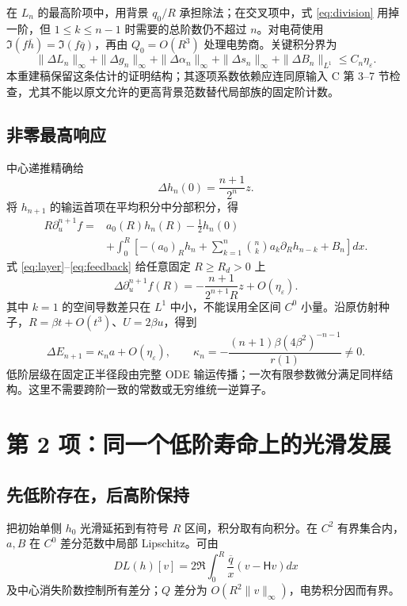 在 $L_n$ 的最高阶项中，用背景 $q_0/R$ 承担除法；在交叉项中，式 \eqref{eq:division} 用掉一阶，但 $1\le k\le n-1$ 时需要的总阶数仍不超过 $n$。对电荷使用
$\Im(f\overline h)=\Im(f\overline q)$，再由 $Q_0=O(R^3)$ 处理电势商。关键积分界为
\begin{equation}\label{eq:feedback}
\|\Delta L_n\|_\infty+\|\Delta g_n\|_\infty
+\|\Delta\alpha_n\|_\infty+\|\Delta s_n\|_\infty
+\|\Delta B_n\|_{L^1}\le C_n\eta_\varepsilon.
\end{equation}
本重建稿保留这条估计的证明结构；其逐项系数依赖应连同原输入 C 第 3--7 节检查，尤其不能以原文允许的更高背景范数替代局部族的固定阶计数。

\subsection{非零最高响应}
中心递推精确给
\[
\Delta h_n(0)=\frac{n+1}{2^n}z.
\]
将 $h_{n+1}$ 的输运首项在平均积分中分部积分，得
\begin{align*}
R\partial_u^{n+1}f={}&a_0(R)h_n(R)-\tfrac12h_n(0)\\
&+\int_0^R\left[-(a_0)_Rh_n+
\sum_{k=1}^n{n\choose k}a_k\partial_Rh_{n-k}+B_n\right]dx.
\end{align*}
式 \eqref{eq:layer}--\eqref{eq:feedback} 给任意固定 $R\ge R_d>0$ 上
\[
\Delta\partial_u^{n+1}f(R)
=-\frac{n+1}{2^{n+1}R}z+O(\eta_\varepsilon).
\]
其中 $k=1$ 的空间导数差只在 $L^1$ 中小，不能误用全区间 $C^0$ 小量。沿原仿射种子，$R=\beta t+O(t^3)$、$U=2\beta u$，得到
\begin{equation}\label{eq:kappa}
\Delta E_{n+1}=\kappa_na+O(\eta_\varepsilon),\qquad
\kappa_n=-\frac{(n+1)\beta(4\beta^2)^{-n-1}}{r(1)}\ne0.
\end{equation}
低阶层级在固定正半径段由完整 ODE 输运传播；一次有限参数微分满足同样结构。这里不需要跨阶一致的常数或无穷维统一逆算子。

\section{第 2 项：同一个低阶寿命上的光滑发展}
\subsection{先低阶存在，后高阶保持}
把初始单侧 $h_0$ 光滑延拓到有符号 $R$ 区间，积分取有向积分。在 $C^2$ 有界集合内，$a,B$ 在 $C^0$ 差分范数中局部 Lipschitz。可由
\[
DL(h)[v]=2\Re\int_0^R\frac{\overline q}{x}(v-\mathsf Hv)dx
\]
及中心消失阶数控制所有差分；$Q$ 差分为 $O(R^2\|v\|_\infty)$，电势积分因而有界。

